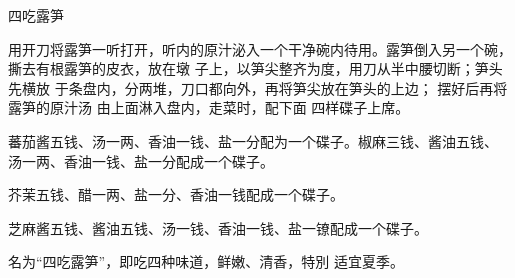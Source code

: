 \begin{recipe}{四吃露笋}

\ingredients


\cooking

\step 用开刀将露笋一听打开，听内的原汁泌入一个干净碗内待用。露笋倒入另一个碗，
撕去有根露笋的皮衣，放在墩 子上，以笋尖整齐为度，用刀从半中腰切断；笋头先横放
于条盘内，分两堆，刀口都向外，再将笋尖放在笋头的上边； 摆好后再将露笋的原汁汤
由上面淋入盘内，走菜时，配下面 四样碟子上席。

\step 蕃茄酱五钱、汤一两、香油一钱、盐一分配为一个碟子。椒麻三钱、酱油五钱、
汤一两、香油一钱、盐一分配成一个碟子。

\step 芥茉五钱、醋一两、盐一分、香油一钱配成一个碟子。

\step 芝麻酱五钱、酱油五钱、汤一钱、香油一钱、盐一镣配成一个碟子。

\notes

名为“四吃露笋”，即吃四种味道，鲜嫩、清香，特別 适宜夏季。

\end{recipe}


